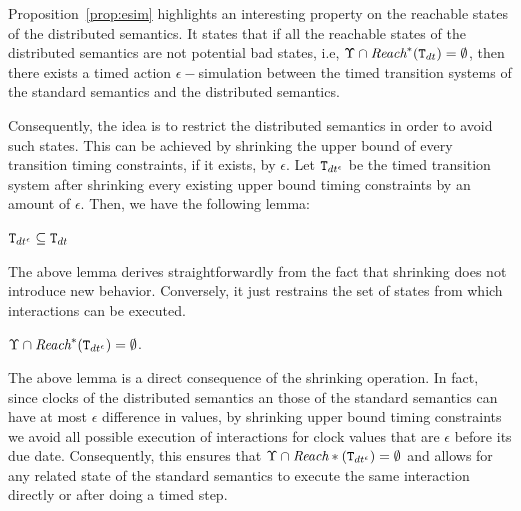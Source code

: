 Proposition~\ref{prop:esim} highlights an interesting property on the reachable states of the 
distributed semantics. It states that if all the reachable states of the 
distributed semantics are not potential bad states, i.e, $\Upsilon\cap\textit{Reach}^*(\texttt{T}_{dt})=
\emptyset $, then there exists a timed action $\epsilon-$simulation between the timed transition 
systems of the standard semantics and the distributed semantics.

Consequently, the idea is to restrict the distributed semantics in order to
avoid such states. 
This can be achieved by shrinking the upper bound of every transition timing constraints, if it 
exists, by $\epsilon$.   
Let $\texttt{T}_{dt^{\epsilon}}$ be the timed transition system after shrinking every existing upper bound timing
constraints by an amount of $\epsilon$. Then, we have the following lemma:
\begin{lemma}
  $\texttt{T}_{dt^{\epsilon}}\subseteq\texttt{T}_{dt}$
\end{lemma}
The above lemma derives straightforwardly from the fact that shrinking does not introduce new
behavior. Conversely, it just restrains the set of states from which interactions can be 
executed.

\begin{lemma}\label{lem:shrink}
  $\Upsilon\cap\textit{Reach}^*(\texttt{T}_{dt^{\epsilon}})=\emptyset$.
\end{lemma}
The above lemma is a direct consequence of the shrinking operation.   
In fact, since clocks of the distributed semantics an those of the standard semantics can have
at most $\epsilon$ difference in values, by shrinking upper bound timing constraints we avoid
all possible execution of interactions for clock values that are $\epsilon$ before its due date.
Consequently, this ensures that $\Upsilon\cap\textit{Reach}*(\texttt{T}_{dt^{\epsilon}})=\emptyset$ and allows for any 
related state of the standard semantics to execute the same interaction
directly or after doing a timed step. 

